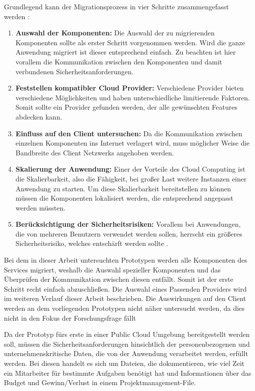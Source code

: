 Grundlegend kann der Migrationsprozess  in vier Schritte zusammengefasst werden \cite[Vgl. auch im Folgenden][S. 34ff]{Maenhaut2016}:
\begin{enumerate}
\item \textbf{Auswahl der Komponenten:} Die Auswahl der zu migrierenden Komponenten sollte als erster Schritt vorgenommen werden. Wird die ganze Anwendung migriert ist dieser entsprechend einfach. Zu beachten ist hier vorallem die Kommunikation zwischen den Komponenten und damit verbundenen Sicherheitsanforderungen.
\item \textbf{Feststellen kompatibler Cloud Provider:} Verschiedene Provider bieten verschiedene Möglichkeiten und haben unterschiedliche limitierende Faktoren. Somit sollte ein Provider gefunden werden, der alle gewünschten Features abdecken kann.
\item \textbf{Einfluss auf den Client untersuchen:} Da die Kommunikation zwischen einzelnen Komponenten ins Internet verlagert wird, muss möglicher Weise die Bandbreite des Client Netzwerks angehoben werden.
\item \textbf{Skalierung der Anwendung:} Einer der Vorteile des Cloud Computing ist die Skalierbarkeit, also die Fähigkeit, bei großer Last weitere Instanzen einer Anwendung zu starten. Um diese Skalierbarkeit bereitstellen zu können müssen die Komponenten lokalisiert werden, die entsprechend angepasst werden müssten.
\item \textbf{Berücksichtigung der Sicherheitsrisiken:} Vorallem bei Anwendungen, die von mehreren Benutzern verwendet werden sollen, herrscht ein größeres Sicherheitsrisiko, welches entschärft werden sollte \cite[Vgl.][S. 38]{Maenhaut2016}.
\end{enumerate}


Bei dem in dieser Arbeit untersuchten Prototypen werden alle Komponenten des Services migriert, weshalb die Auswahl spezieller Komponenten und das Überprüfen der Kommunikation zwischen diesen entfällt. Somit ist der erste Schritt recht einfach abzuschließen. Die Auswahl eines Passenden Providers wird im weiteren Verlauf dieser Arbeit beschrieben. Die Auswirkungen auf den Client werden an dem vorliegenden Prototypen nicht näher untersucht werden, da dies nicht in den Fokus der Forschungsfrage fällt \pagebreak

Da der Prototyp fürs erste in einer Public Cloud Umgebung bereitgestellt werden soll, müssen die Sicherheitsanforderungen hinsichtlich der personenbezogenen und unternehmenskritische Daten, die von der Anwendung verarbeitet werden, erfüllt werden. Bei diesen handelt es sich um Dateien, die dokumentieren, wie viel Zeit ein Mitarbeiter für bestimmte Aufgaben benötigt hat und Informationen über das Budget und Gewinn/Verlust in einem Projektmanagement-File.


